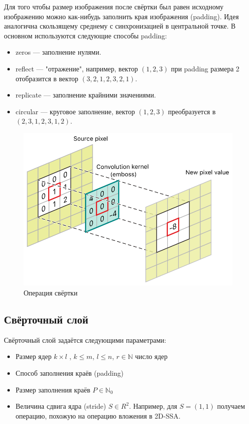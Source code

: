 \documentclass{article}
\renewcommand{\leq}{\leqslant}
\theoremstyle{definition}
\theoremstyle{theorem}
\theoremstyle{remark}
\theoremstyle{theorem}
\theoremstyle{example}
\theoremstyle{theorem}
\theoremstyle{theorem}
\theoremstyle{theorem}
\theoremstyle{theorem}
\begin{document}
	Для того чтобы размер изображения после свёртки был равен исходному изображению можно как-нибудь заполнить края изображения (padding). Идея аналогична скользящему среднему с синхронизацией в центральной точке. 
	 В основном используются следующие способы padding:
	 \begin{itemize}
	 	\item zeros --- заполнение нулями.
	 	\item reflect --- "отражение", например, вектор $(1,2,3)$ при padding размера 2 отобразится в вектор $(3,2,1,2,3,2,1)$.
	 	\item replicate --- заполнение крайними значениями.
	 	\item circular --- круговое заполнение, вектор $(1,2,3)$ преобразуется в $(2,3,1,2,3,1,2)$.
	 \end{itemize}
	 \newpage
	 \begin{figure}[h!]
	 	\includegraphics[width=\textwidth]{img/conv.png}\caption{Операция свёртки}
	 \end{figure}
	 \subsection{Свёрточный слой}
	 	Свёрточный слой задаётся следующими параметрами:
	 	\begin{itemize}
	 		\item Размер ядер $k\times l$ , $k\leq m$, $l\leq n$, $r\in\mathbb N$ число ядер
	 		\item Способ заполнения краёв (padding)
	 		\item Размер заполнения краёв $P\in \mathbb N_0$
	 		\item Величина сдвига ядра (stride) $S\in R^2$. Например, для $S=(1,1)$ получаем операцию, похожую на операцию вложения в 2D-SSA.
	 	\end{itemize}
\end{document}
